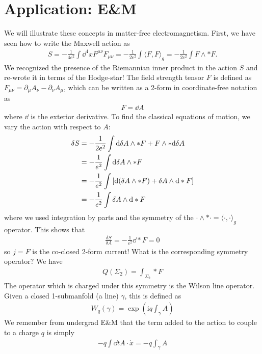 \documentclass[11pt]{article}
\newcommand{\ii}{\mathrm{i}}
\begin{document}
\section{Application: E\&M}
We will illustrate these concepts in matter-free electromagnetism. First, we
have seen how to write the Maxwell action as
\begin{align}
  S = -\frac{1}{4e^2}\int \dd^4 x F^{\mu\nu}F_{\mu \nu} = -\frac{1}{2e^2}\int \langle  F, F \rangle_{g} = -\frac{1}{2e^2}\int F \wedge *F .
\end{align}
We recognized the presence of the Riemannian inner product in the action $S$ and
re-wrote it in terms of the Hodge-star! The field strength tensor $F$ is defined
as $F_{\mu \nu} = \partial_\mu A_\nu - \partial_\nu A_\mu$, which can be written
as a 2-form in coordinate-free notation as
\begin{align}
F = \dd A
\end{align}
where $\dd$ is the exterior derivative. To find the classical equations of
motion, we vary the action with respect to $A$:
\begin{align}
  \delta S &= -\frac{1}{2e^2}\int \dd \delta A \wedge *F + F \wedge * \dd \delta A \notag\\
  &= -\frac{1}{e^2}\int \dd \delta A \wedge *F \notag\\
  &= -\frac{1}{e^2}\int \left[ \dd (\delta A \wedge *F) + \delta A \wedge \dd *F \right] \notag\\
  &= -\frac{1}{e^2} \int \delta A \wedge \dd *F
\end{align}
where we used integration by parts and the symmetry of the $ \cdot \wedge * \cdot= \langle
\cdot, \cdot  \rangle_g$ operator. This shows that
\begin{align}
\frac{\delta S}{\delta A} = -\frac{1}{e^2} \dd *F = 0
\end{align}
so $j = F$ is the co-closed 2-form current! What is the corresponding symmetry
operator? We have
\begin{align}
Q(\Sigma_2) = \int_{\Sigma_2} *F
\end{align}
The operator which is charged under this symmetry is the Wilson line operator.
Given a closed 1-submanfold (a line) $\gamma$, this is defined as
\begin{align}
  W_q(\gamma) = \exp\left(\ii  q\int_\gamma A\right)
\end{align}
We remember from undergrad E\&M that the term added to the action to couple to a
charge $q$ is simply
\begin{align}
- q\int \dd t A \cdot \dot x = -q\int_\gamma A
\end{align}
\end{document}
